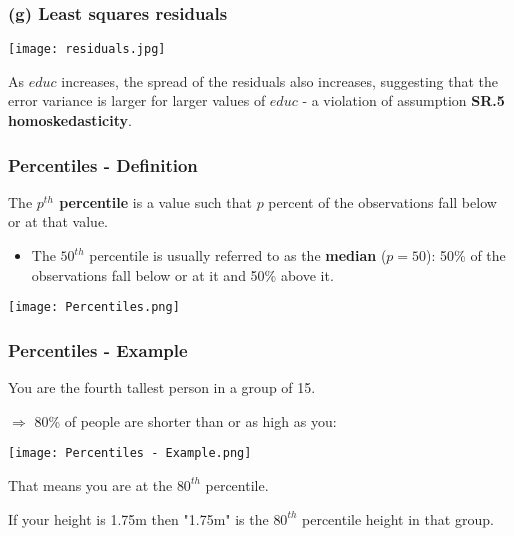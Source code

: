 \documentclass[11pt, xcolor=x11names,compress]{beamer}
\begin{document}
\begin{frame}[fragile,t]
\frametitle{(g) Least squares residuals}
\begin{center}
    \texttt{[image: residuals.jpg]}
\end{center}
\item As $educ$ increases, the spread of the residuals also increases, suggesting that the error variance is larger for larger values of $educ$ - a violation of assumption \textbf{SR.5 homoskedasticity}. 
\end{frame}

\begin{frame}[fragile,t]
\frametitle{Percentiles - Definition}\label{Percentiles}
The \textbf{$p^{th}$ percentile} is a value such that $p$ percent of the observations fall below or at that value. 

\begin{itemize}
    \item The $50^{th}$ percentile is usually referred to as the \textbf{median} ($p = 50$):
    50\% of the observations fall below or at it and 50\% above it. 
\end{itemize}
\begin{center}
    \texttt{[image: Percentiles.png]}
\end{center}
\hyperlink{a1)}{}
\end{frame}

\begin{frame}[fragile,t]
\frametitle{Percentiles - Example}

You are the fourth tallest person in a group of 15. 

\vspace{3mm}

$\Longrightarrow$ 80\% of people are shorter than or as high as you:
\begin{center}
    \texttt{[image: Percentiles - Example.png]}
\end{center}
That means you are at the $80^{th}$ percentile.

\vspace{3mm}

If your height is 1.75m then "1.75m" is the $80^{th}$ percentile height in that group.
\hyperlink{a1)}{}
\end{frame}
\end{document}
